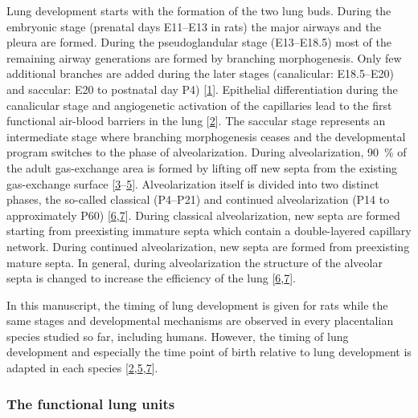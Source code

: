 \documentclass[
  american,
]{article}
\begin{document}
Lung development starts with the formation of the two lung buds.
During the embryonic stage (prenatal days E11--E13 in rats) the major airways and the pleura are formed.
During the pseudoglandular stage (E13--E18.5) most of the remaining airway generations are formed by branching morphogenesis.
Only few additional branches are added during the later stages (canalicular: E18.5--E20) and saccular: E20 to postnatal day P4) {[}\protect\hyperlink{ref-TsNwin2E}{1}{]}.
Epithelial differentiation during the canalicular stage and angiogenetic activation of the capillaries lead to the first functional air-blood barriers in the lung {[}\protect\hyperlink{ref-ODQCVC23}{2}{]}.
The saccular stage represents an intermediate stage where branching morphogenesis ceases and the developmental program switches to the phase of alveolarization.
During alveolarization, 90~\% of the adult gas-exchange area is formed by lifting off new septa from the existing gas-exchange surface {[}\protect\hyperlink{ref-auNiE56G}{3}--\protect\hyperlink{ref-XQLPrPTJ}{5}{]}.
Alveolarization itself is divided into two distinct phases, the so-called classical (P4--P21) and continued alveolarization (P14 to approximately P60) {[}\protect\hyperlink{ref-wnl86DEM}{6},\protect\hyperlink{ref-d1YV8oOK}{7}{]}.
During classical alveolarization, new septa are formed starting from preexisting immature septa which contain a double-layered capillary network.
During continued alveolarization, new septa are formed from preexisting mature septa.
In general, during alveolarization the structure of the alveolar septa is changed to increase the efficiency of the lung {[}\protect\hyperlink{ref-wnl86DEM}{6},\protect\hyperlink{ref-d1YV8oOK}{7}{]}.

In this manuscript, the timing of lung development is given for rats while the same stages and developmental mechanisms are observed in every placentalian species studied so far, including humans.
However, the timing of lung development and especially the time point of birth relative to lung development is adapted in each species {[}\protect\hyperlink{ref-ODQCVC23}{2},\protect\hyperlink{ref-XQLPrPTJ}{5},\protect\hyperlink{ref-d1YV8oOK}{7}{]}.

\hypertarget{the-functional-lung-units}{%
\subsubsection{The functional lung units}\label{the-functional-lung-units}}
\end{document}
